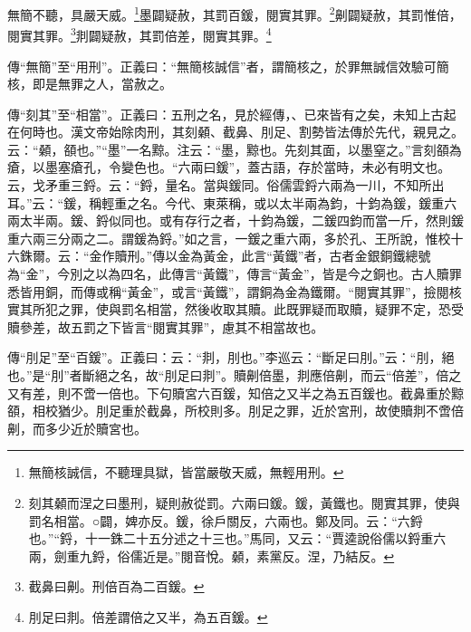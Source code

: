 無簡不聽，具嚴天威。\footnote{無簡核誠信，不聽理具獄，皆當嚴敬天威，無輕用刑。}墨闢疑赦，其罰百鍰，閱實其罪。\footnote{刻其顙而涅之曰墨刑，疑則赦從罰。六兩曰鍰。鍰，黃鐵也。閱實其罪，使與罰名相當。○闢，婢亦反。鍰，徐戶關反，六兩也。鄭及同。云：“六鋝也。”“鋝，十一銖二十五分述之十三也。”馬同，又云：“賈逵說俗儒以鋝重六兩，劍重九鋝，俗儒近是。”閱音悅。顙，素黨反。涅，乃結反。}劓闢疑赦，其罰惟倍，閱實其罪。\footnote{截鼻曰劓。刑倍百為二百鍰。}剕闢疑赦，其罰倍差，閱實其罪。\footnote{刖足曰剕。倍差謂倍之又半，為五百鍰。}


{\noindent\zhuan{}\fzbyks 傳“無簡”至“用刑”。正義曰：“無簡核誠信”者，謂簡核之，於罪無誠信效驗可簡核，即是無罪之人，當赦之。 \par}

{\noindent\zhuan{}\fzbyks 傳“刻其”至“相當”。正義曰：五刑之名，見於經傳，、已來皆有之矣，未知上古起在何時也。漢文帝始除肉刑，其刻顙、截鼻、刖足、割勢皆法傳於先代，親見之。云：“顙，頟也。”“墨”一名黥。注云：“墨，黥也。先刻其面，以墨窒之。”言刻頟為瘡，以墨塞瘡孔，令變色也。“六兩曰鍰”，蓋古語，存於當時，未必有明文也。云，戈矛重三鋝。云：“鋝，量名。當與鍰同。俗儒雲鋝六兩為一川，不知所出耳。”云：“鍰，稱輕重之名。今代、東萊稱，或以太半兩為鈞，十鈞為鍰，鍰重六兩太半兩。鍰、鋝似同也。或有存行之者，十鈞為鍰，二鍰四鈞而當一斤，然則鍰重六兩三分兩之二。謂鍰為鋝。”如之言，一鍰之重六兩，多於孔、王所說，惟校十六銖爾。云：“金作贖刑。”傳以金為黃金，此言“黃鐵”者，古者金銀銅鐵總號為“金”，今別之以為四名，此傳言“黃鐵”，傳言“黃金”，皆是今之銅也。古人贖罪悉皆用銅，而傳或稱“黃金”，或言“黃鐵”，謂銅為金為鐵爾。“閱實其罪”，撿閱核實其所犯之罪，使與罰名相當，然後收取其贖。此既罪疑而取贖，疑罪不定，恐受贖參差，故五罰之下皆言“閱實其罪”，慮其不相當故也。 \par}

{\noindent\zhuan{}\fzbyks 傳“刖足”至“百鍰”。正義曰：云：“剕，刖也。”李巡云：“斷足曰刖。”云：“刖，絕也。”是“刖”者斷絕之名，故“刖足曰剕”。贖劓倍墨，剕應倍劓，而云“倍差”，倍之又有差，則不啻一倍也。下句贖宮六百鍰，知倍之又半之為五百鍰也。截鼻重於黥頟，相校猶少。刖足重於截鼻，所校則多。刖足之罪，近於宮刑，故使贖剕不啻倍劓，而多少近於贖宮也。 \par}

